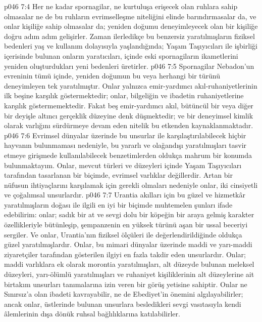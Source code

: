 \vs p046 7:4 Her ne kadar spornagilar, ne kurtuluşa erişecek olan ruhlara sahip olmasalar ne de bu ruhların evrimselleşme niteliğini elinde barındırmasalar da, ve onlar kişiliğe sahip olmasalar da; yeniden doğumu deneyimleyecek olan bir kişiliğe doğru adım adım gelişirler. Zaman ilerledikçe bu benzersiz yaratılmışların fiziksel bedenleri yaş ve kullanım dolayısıyla yaşlandığında; Yaşam Taşıyıcıları ile işbirliği içerisinde bulunan onların yaratıcıları, içinde eski spornagiların ikametlerini yeniden oluşturdukları yeni bedenleri üretirler.
\vs p046 7:5 Spornagilar Nebadon’un evreninin tümü içinde, yeniden doğumun bu veya herhangi bir türünü deneyimleyen tek yaratılmıştır. Onlar yalnızca emir\hyp{}yardımcı akıl\hyp{}ruhaniyetlerinin ilk beşine karşılık göstermektedir; onlar, bilgeliğin ve ibadetin ruhaniyetlerine karşılık göstermemektedir. Fakat beş emir\hyp{}yardımcı akıl, bütüncül bir veya diğer bir deyişle altıncı gerçeklik düzeyine denk düşmektedir; ve bir deneyimsel kimlik olarak varlığını sürdürmeye devam eden nitelik bu etkenden kaynaklanmaktadır.
\vs p046 7:6 Evrimsel dünyalar üzerinde bu unsurlar ile karşılaştırılabilecek hiçbir hayvanın bulunmaması nedeniyle, bu yararlı ve olağandışı yaratılmışları tasvir etmeye girişmede kullanılabilecek benzetimlerden oldukça mahrum bir konumda bulunmaktayım. Onlar, mevcut türleri ve düzeyleri içinde Yaşam Taşıyıcıları tarafından tasarlanan bir biçimde, evrimsel varlıklar değillerdir. Artan bir nüfusun ihtiyaçlarını karşılamak için gerekli olmaları nedeniyle onlar, iki cinsiyetli ve çoğalımsal unsurlardır.
\vs p046 7:7 Urantia akılları için bu güzel ve hizmetkâr yaratılmışların doğası ile ilgili en iyi bir biçimde muhtemelen şunları ifade edebilirim: onlar; sadık bir at ve sevgi dolu bir köpeğin bir araya gelmiş karakter özellikleriyle bütünleşip, şempanzenin en yüksek türünü aşan bir ussal beceriyi sergiler. Ve onlar, Urantia’nın fiziksel ölçüleri ile değerlendirildiğinde oldukça güzel yaratılmışlardır. Onlar, bu mimari dünyalar üzerinde maddi ve yarı\hyp{}maddi ziyaretçiler tarafından gösterilen ilgiyi en fazla takdir eden unsurlardır. Onlar; maddi varlıklara ek olarak morontia yaratılmışları, alt düzeyde bulunan meleksel düzeyleri, yarı\hyp{}ölümlü yaratılmışları ve ruhaniyet kişiliklerinin alt düzeylerine ait birtakım unsurları tanımalarına izin veren bir görüş yetisine sahiptir. Onlar ne Sınırsız’a olan ibadeti kavrayabilir, ne de Ebediyet’in önemini algılayabilirler; ancak onlar, üstlerinde bulunan unsurlara besledikleri sevgi vasıtasıyla kendi âlemlerinin dışa dönük ruhsal bağlılıklarına katılabilirler.
